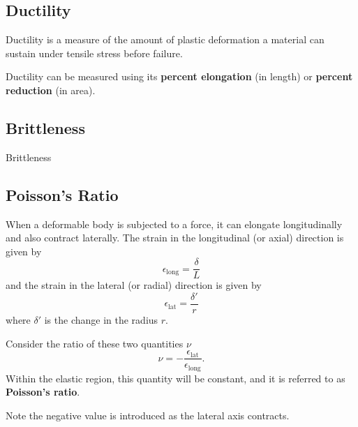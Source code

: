 \documentclass{article}
\begin{document}
\subsection{Ductility}
\begin{definition}[Ductility]
    Ductility is a measure of the amount of plastic deformation a material can sustain under tensile stress before failure.

    Ductility can be measured using its \textbf{percent elongation} (in length) or \textbf{percent reduction} (in area).
\end{definition}
\subsection{Brittleness}
\begin{definition}[Brittleness]
    Brittleness
\end{definition}
\subsection{Poisson's Ratio}
When a deformable body is subjected to a force, it can elongate longitudinally and also contract laterally.
The strain in the longitudinal (or axial) direction is given by
\begin{equation*}
    \epsilon_{\mathrm{long}} = \frac{\delta}{L}
\end{equation*}
and the strain in the lateral (or radial) direction is given by
\begin{equation*}
    \epsilon_{\mathrm{lat}} = \frac{\delta'}{r}
\end{equation*}
where \(\delta'\) is the change in the radius \(r\).

Consider the ratio of these two quantities \(\nu\)
\begin{equation*}
    \nu = -\frac{\epsilon_{\mathrm{lat}}}{\epsilon_{\mathrm{long}}}.
\end{equation*}
Within the elastic region, this quantity will be constant, and it is referred 
to as \textbf{Poisson's ratio}.

Note the negative value is introduced as the lateral axis contracts.
\end{document}

